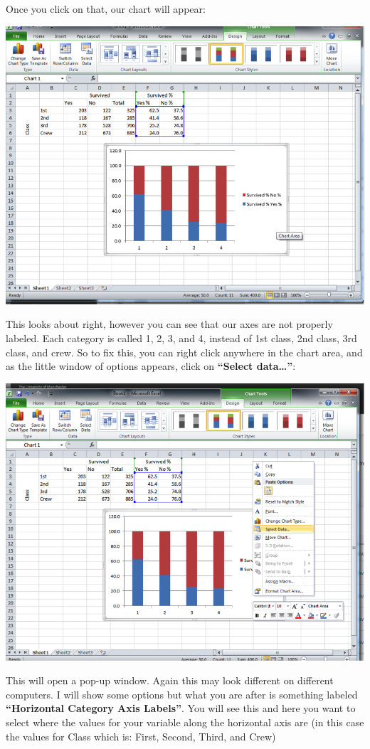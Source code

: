 \documentclass[
]{book}
\begin{document}
Once you click on that, our chart will appear:

\includegraphics{imgs/stacked_col_2.png}

This looks about right, however you can see that our axes are not properly labeled. Each category is called 1, 2, 3, and 4, instead of 1st class, 2nd class, 3rd class, and crew. So to fix this, you can right click anywhere in the chart area, and as the little window of options appears, click on \textbf{``Select data\ldots{}''}:

\includegraphics{imgs/stacked_col_3.png}

This will open a pop-up window. Again this may look different on different computers. I will show some options but what you are after is something labeled \textbf{``Horizontal Category Axis Labels''}. You will see this and here you want to select where the values for your variable along the horizontal axis are (in this case the values for Class which is: First, Second, Third, and Crew)
\end{document}
